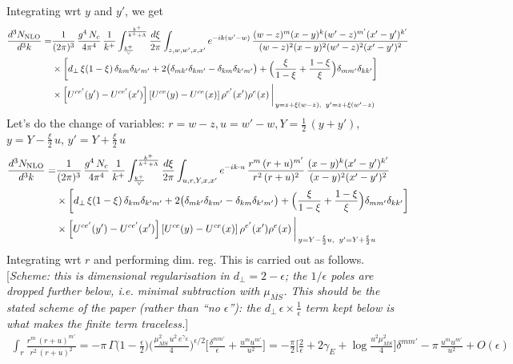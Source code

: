 \documentclass[9pt]{article}
\newcommand{\rnote}[1]{{\color{teal}[\textit{#1}]}}
\numberwithin{equation}{section}
\begin{document}
Integrating wrt $y$ and $y'$, we get
\begin{align}
\frac{d^{3}N_{\rm NLO}}{d^{3}k}= &\frac{1}{(2\pi)^{3}}\,\frac{g^{4}\,N_{c}}{4\pi^{4}}\,\frac{1}{k^{+}}\int_{\frac{k^{+}}{\vee}}^{\frac{k^{+}}{k^{+}+\Lambda}}\frac{d\xi}{2\pi}\int_{z,w,w',x,x'}e^{-ik(w'-w)}\,\frac{(w-z)^{m}(x-y)^{k}(w'-z)^{m'}(x'-y')^{k'}}{(w-z)^{2}(x-y)^{2}(w'-z)^{2}(x'-y')^{2}}\notag\\
&\times\bigg[d_{\perp}\,\xi(1-\xi)\,\delta_{km}\delta_{k'm'}+2\big(\delta_{mk'}\delta_{km'}-\delta_{km}\delta_{k'm'}\big)+\Big(\frac{\xi}{1-\xi}+\frac{1-\xi}{\xi}\Big)\delta_{mm'}\delta_{kk'}\bigg]\notag\\
&\times\left[U^{ce'}(y') - U^{ce'}(x')\right]\left[U^{ce}(y) - U^{ce}(x)\right]\rho^{e'}(x')\rho^{e}(x)\,\bigg|_{\,y=z+\xi(w-z),\;\;y'=z+\xi(w'-z)}
\end{align}
Let's do the change of variables: $r = w-z, u = w'-w, Y = \frac{1}{2}\, (y+y')$, $y = Y - \frac{\xi}{2}\,u$, $y' = Y +\frac{\xi}{2}\,u$
\begin{align}
\frac{d^{3}N_{\rm NLO}}{d^{3}k}= &\frac{1}{(2\pi)^{3}}\,\frac{g^{4}\,N_{c}}{4\pi^{4}}\,\frac{1}{k^{+}}\int_{\frac{k^{+}}{\vee}}^{\frac{k^{+}}{k^{+}+\Lambda}}\frac{d\xi}{2\pi}\int_{u,r,Y,x,x'}e^{-ik\cdot u}\,\frac{r^{m}\,(r+u)^{m'}}{r^{2}\,(r+u)^{2}}\,\frac{(x-y)^{k}(x'-y')^{k'}}{(x-y)^{2}(x'-y')^{2}}\notag\\
&\times\bigg[d_{\perp}\,\xi(1-\xi)\,\delta_{km}\delta_{k'm'}+2\big(\delta_{mk'}\delta_{km'}-\delta_{km}\delta_{k'm'}\big)+\Big(\frac{\xi}{1-\xi}+\frac{1-\xi}{\xi}\Big)\delta_{mm'}\delta_{kk'}\bigg]\notag\\
&\times\left[U^{ce'}(y') - U^{ce'}(x')\right]\left[U^{ce}(y) - U^{ce}(x)\right]\rho^{e'}(x')\rho^{e}(x)\,\bigg|_{\,y=Y-\frac{\xi}{2}u,\;\;y'=Y+\frac{\xi}{2}u}
\end{align}
Integrating wrt $r$ and performing dim. reg. This is carried out as follows.
\rnote{Scheme: this is dimensional regularisation in $d_{\perp}=2-\epsilon$; the $1/\epsilon$ poles are dropped further below, i.e. minimal subtraction with $\mu_{\overline{MS}}$. This should be the stated scheme of the paper (rather than ``no $\epsilon$''): the $d_{\perp}\,\epsilon\times\frac{1}{\epsilon}$ term kept below is what makes the finite term traceless.}
\begin{align}
\int_{r}\frac{r^{m}\,(r+u)^{m'}}{r^{2}\,(r+u)^{2}}
=-\pi\,\Gamma\big(1-\tfrac{\epsilon}{2}\big)\Big(\frac{\mu^{2}_{\overline{MS}}\,u^{2}\,e^{\gamma_E}}{4}\Big)^{\epsilon/2}\Big[\frac{\delta^{mm'}}{\epsilon}+\frac{u^{m}u^{m'}}{u^{2}}\Big]
=-\frac{\pi}{2}\Big[\frac{2}{\epsilon}+2\gamma_{E}+\log\frac{u^{2}\mu^{2}_{\overline{MS}}}{4}\Big]\delta^{mm'}-\pi\,\frac{u^{m}u^{m'}}{u^{2}}+O(\epsilon)
\end{align}
\end{document}
